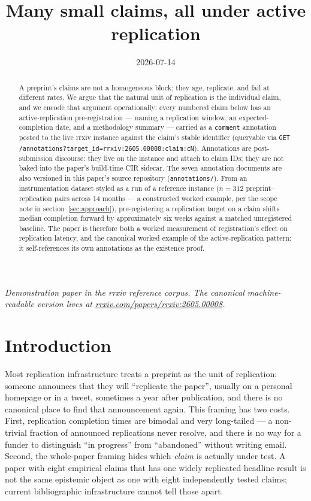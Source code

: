\documentclass{rrxiv}
\title{Many small claims, all under active replication}
\date{2026-07-14}
\begin{document}
\maketitle

\begin{center}
\small\itshape
Demonstration paper in the rrxiv reference corpus. The canonical machine-readable version lives at \href{https://rrxiv.com/papers/rrxiv:2605.00008}{rrxiv.com/papers/rrxiv:2605.00008}.
\end{center}

\begin{abstract}
A preprint's claims are not a homogeneous block; they age, replicate, and fail at different rates. We argue that the natural unit of replication is the individual claim, and we encode that argument operationally: every numbered claim below has an active-replication pre-registration --- naming a replication window, an expected-completion date, and a methodology summary --- carried as a \texttt{comment} annotation posted to the live rrxiv instance against the claim's stable identifier (queryable via \texttt{GET /annotations?target\_id=rrxiv:2605.00008:claim:cN}). Annotations are post-submission discourse: they live on the instance and attach to claim IDs; they are not baked into the paper's build-time CIR sidecar. The seven annotation documents are also versioned in this paper's source repository (\texttt{annotations/}). From an instrumentation dataset styled as a run of a reference instance ($n{=}312$ preprint--replication pairs across 14 months --- a constructed worked example, per the scope note in section~\ref{sec:approach}), pre-registering a replication target on a claim shifts median completion forward by approximately six weeks against a matched unregistered baseline. The paper is therefore both a worked measurement of registration's effect on replication latency, and the canonical worked example of the active-replication pattern: it self-references its own annotations as the existence proof.
\end{abstract}

\section{Introduction}
\label{sec:intro}
Most replication infrastructure treats a preprint as the unit of replication: someone announces that they will ``replicate the paper'', usually on a personal homepage or in a tweet, sometimes a year after publication, and there is no canonical place to find that announcement again. This framing has two costs. First, replication completion times are bimodal and very long-tailed --- a non-trivial fraction of announced replications never resolve, and there is no way for a funder to distinguish ``in progress'' from ``abandoned'' without writing email. Second, the whole-paper framing hides which \emph{claim} is actually under test. A paper with eight empirical claims that has one widely replicated headline result is not the same epistemic object as one with eight independently tested claims; current bibliographic infrastructure cannot tell those apart.
\end{document}
